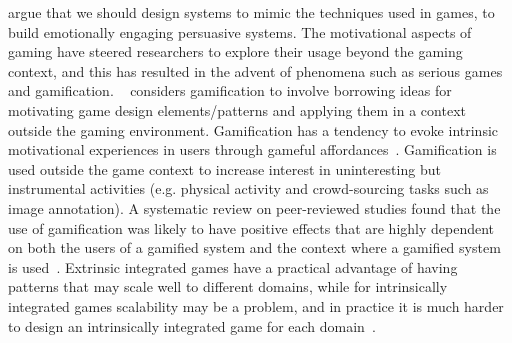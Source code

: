 \cite{nakajima2013designing} argue that we should design systems to mimic the techniques used in games, to build emotionally engaging persuasive systems. The motivational aspects of gaming have steered researchers to explore their usage beyond the gaming context, and this has resulted in the advent of phenomena such as serious games and gamification. ~\cite{deterding2011game} considers gamification to involve borrowing ideas for motivating game design elements/patterns and applying them in a context outside the gaming environment. Gamification has a tendency to evoke intrinsic motivational experiences in users through gameful affordances~\citep{hamari2014persuasive}. Gamification is used outside the game context to increase interest in uninteresting but instrumental activities (e.g. physical activity and crowd-sourcing tasks such as image annotation). A systematic review on peer-reviewed studies found that the use of gamification was likely to have positive effects that are highly dependent on both the users of a gamified system and the context where a gamified system is used~\citep{hamari2014does}. Extrinsic integrated games have a practical advantage of having patterns that may scale well to different domains, while for intrinsically integrated games scalability may be a problem, and in practice it is much harder to design an intrinsically integrated game for each domain~\citep{preist2015use}.

